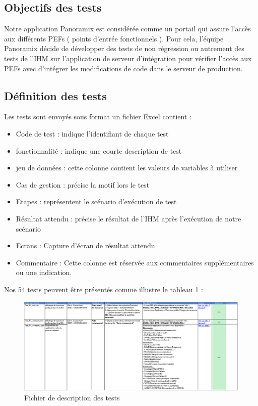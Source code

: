 \subsection{Objectifs des tests}
Notre application Panoramix est considérée comme un portail qui assure l’accès aux différents PEFs ( points d’entrée fonctionnels ). Pour cela, l’équipe Panoramix décide de développer des  tests de non régression ou autrement des tests de l’IHM sur l’application de serveur d'intégration pour vérifier l’accès aux PEFs avec d’intégrer les modifications de code dans le serveur de production.
\subsection{Définition des tests}
Les tests sont envoyés sous format un fichier Excel contient :
\begin{itemize}
	\item Code de test : indique l’identifiant de chaque test
	\item fonctionnalité : indique une courte description de test
	\item jeu de données : cette colonne contient les valeurs de variables à utiliser
	\item Cas de gestion : précise la motif lors le test
	\item Etapes : représentent le scénario d'exécution de test
	\item Résultat attendu : précise le résultat de l’IHM après l'exécution de notre scénario  
	\item Ecrans : Capture d’écran de résultat attendu 
	\item Commentaire : Cette colonne est réservée aux commentaires supplémentaires ou une indication.
\end{itemize}
Nos 54 tests peuvent être présentés comme illustre le tableau \ref{fig:excel-robot} :
\begin{figure}[H]
	\centering
	\includegraphics[width=1\linewidth]{"img/excel robot"}
	\caption[Fichier de description des tests]{Fichier de description des tests}
	\label{fig:excel-robot}
\end{figure}

